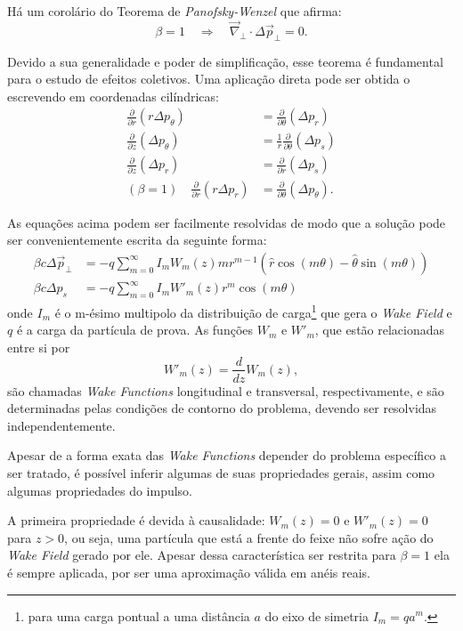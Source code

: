 Há um corolário do Teorema de \textit{Panofsky-Wenzel} que afirma:
\begin{equation}
 \beta = 1\quad \Rightarrow \quad \vec{\nabla}_\bot \cdot
\Delta\vec{ p}_\bot = 0.
\end{equation}

Devido a sua generalidade e poder de simplificação, esse teorema é fundamental para o estudo de efeitos coletivos. Uma aplicação direta pode ser obtida o escrevendo em coordenadas cilíndricas:
\begin{align}
 \frac{\partial }{\partial r} (r\Delta p_\theta)& = \frac{\partial}{\partial
\theta}(\Delta p_r) \\
 \frac{\partial}{\partial z}(\Delta p_\theta) &= \frac{1}{r}
\frac{\partial}{\partial \theta}(\Delta p_s) \\
 \frac{\partial}{\partial z}(\Delta p_r) &= \frac{\partial}{\partial r}(\Delta
p_s) \\
(\beta = 1) \quad  \frac{\partial}{\partial r}(r\Delta p_r) &=
\frac{\partial}{\partial \theta}(\Delta p_\theta).
\end{align}

As equações acima podem ser facilmente resolvidas de modo que a solução pode ser convenientemente escrita da seguinte forma:
\begin{align}
\label{eq:W}
 \beta c \Delta \vec{p}_\bot &= -q \sum_{m=0}^\infty I_m W_m(z) m
r^{m-1}\left(\hat{r}\cos(m\theta) - \hat{\theta}\sin(m\theta)\right)\\
\label{eq:W'}
\beta c \Delta p_s &= -q \sum_{m=0}^\infty I_m W'_m(z) r^{m}\cos(m\theta)
\end{align}
onde $I_m$ é o m-ésimo multipolo da distribuição de carga\footnote{para uma carga pontual a uma distância $a$ do eixo de simetria $I_m=qa^m$.} que gera o \textit{Wake Field} e $q$ é a carga da partícula de prova. As funções $W_m$ e $W'_m$, que estão relacionadas entre si por
\begin{equation}
 W'_m(z)=\frac{d}{dz}W_m(z),
\end{equation}
são chamadas \textit{Wake Functions} longitudinal e transversal, respectivamente, e são determinadas pelas condições de contorno do problema, devendo ser resolvidas independentemente.

Apesar de a forma exata das \textit{Wake Functions} depender do problema específico a ser tratado, é possível inferir algumas de suas propriedades gerais, assim como algumas propriedades do impulso.

A primeira propriedade é devida à causalidade: $W_m(z) = 0$ e $W'_m(z)=0$ para $z>0$, ou seja, uma partícula que está a frente do feixe não sofre ação do \textit{Wake Field} gerado por ele. Apesar dessa característica ser restrita para $\beta = 1$ ela é sempre aplicada, por ser uma aproximação válida em anéis
reais.

